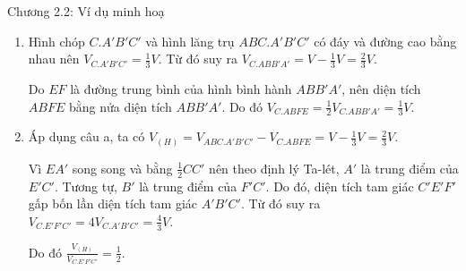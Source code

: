 \begin{frame}{Chương 2.2: Ví dụ minh hoạ}
\begin{enumerate}[label=(\alph*)]
    \item Hình chóp $C.A'B'C'$ và hình lăng trụ $ABC.A'B'C'$ có đáy và đường cao bằng nhau nên $V_{C.A'B'C'} = \frac{1}{3} V$. Từ đó suy ra $V_{C.ABB'A'} = V - \frac{1}{3}V = \frac{2}{3} V$.
    
    Do $EF$ là đường trung bình của hình bình hành $ABB'A'$, nên diện tích $ABFE$ bằng nửa diện tích $ABB'A'$. Do đó $V_{C.ABFE} = \frac{1}{2} V_{C.ABB'A'} = \frac{1}{3} V$.
    
    \item Áp dụng câu a, ta có $V_{(H)} = V_{ABC.A'B'C'} - V_{C.ABFE} = V - \frac{1}{3} V = \frac{2}{3} V$.
    
    Vì $EA'$ song song và bằng $\frac{1}{2} CC'$ nên theo định lý Ta-lét, $A'$ là trung điểm của $E'C'$. Tương tự, $B'$ là trung điểm của $F'C'$. Do đó, diện tích tam giác $C'E'F'$ gấp bốn lần diện tích tam giác $A'B'C'$. Từ đó suy ra $V_{C.E'F'C'} = 4 V_{C.A'B'C'} = \frac{4}{3} V$.
    
    Do đó $\frac{V_{(H)}}{V_{C.E'F'C'}} = \frac{1}{2}$.
\end{enumerate}
\end{frame}
